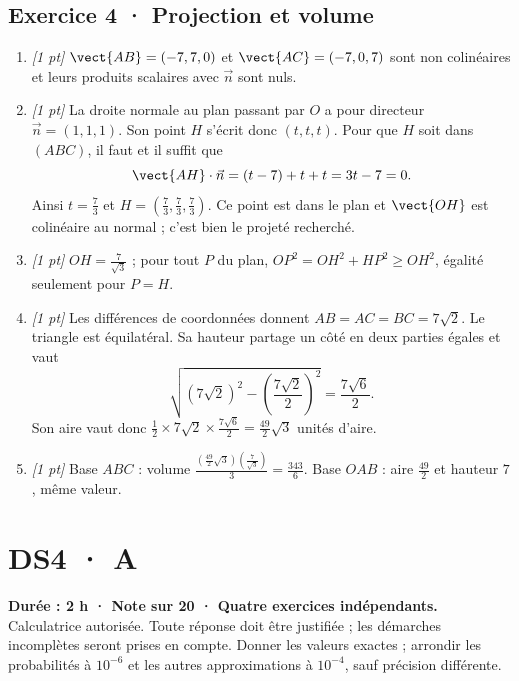\subsection*{Exercice 4 · Projection et volume}\begin{enumerate}

\item \textit{[1 pt]} $\vect{AB}=(-7,7,0)$ et $\vect{AC}=(-7,0,7)$ sont non colinéaires et leurs produits scalaires avec $\vec n$ sont nuls.

\item \textit{[1 pt]} La droite normale au plan passant par $O$ a pour directeur $\vec n=(1,1,1)$. Son point $H$ s'écrit donc $(t,t,t)$. Pour que $H$ soit dans $(ABC)$, il faut et il suffit que
\[\vect{AH}\cdot\vec n=(t-7)+t+t=3t-7=0.\]
Ainsi $t=\frac{7}{3}$ et $H=(\frac{7}{3},\frac{7}{3},\frac{7}{3})$. Ce point est dans le plan et $\vect{OH}$ est colinéaire au normal ; c'est bien le projeté recherché.

\item \textit{[1 pt]} $OH=\frac{7}{\sqrt{3}}$ ; pour tout $P$ du plan, $OP^2=OH^2+HP^2\ge OH^2$, égalité seulement pour $P=H$.

\item \textit{[1 pt]} Les différences de coordonnées donnent $AB=AC=BC=7\sqrt2$. Le triangle est équilatéral. Sa hauteur partage un côté en deux parties égales et vaut
\[\sqrt{(7\sqrt2)^2-(\frac{7\sqrt{2}}{2})^2}=\frac{7\sqrt6}{2}.\]
Son aire vaut donc $\frac12\times 7\sqrt2\times\frac{7\sqrt6}{2}=\frac{49}{2}\sqrt3$ unités d'aire.

\item \textit{[1 pt]} Base $ABC$ : volume $\frac{(\frac{49}{2}\sqrt3)(\frac{7}{\sqrt{3}})}{3}=\frac{343}{6}$. Base $OAB$ : aire $\frac{49}{2}$ et hauteur $7$, même valeur.

\end{enumerate}

\fi

\ifmxteacher

\mxnewpage{}\label{sujet:6-3}

\section*{DS4 · A}


\textbf{Durée : 2 h · Note sur 20 · Quatre exercices indépendants.}\\Calculatrice autorisée. Toute réponse doit être justifiée ; les démarches incomplètes seront prises en compte. Donner les valeurs exactes ; arrondir les probabilités à $10^{-6}$ et les autres approximations à $10^{-4}$, sauf précision différente.

